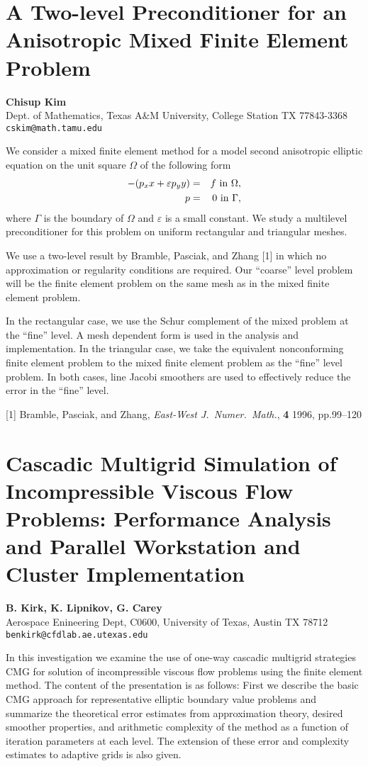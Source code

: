 \documentclass[11pt]{article}
\newcommand{\nextab}[4]{
	\section{#2}
	{\bf #1} \\ \nopagebreak
	{#3} \\ \nopagebreak
	{\tt #4} \nopagebreak
	}
\begin{document}

\nextab
{Chisup Kim}
{A Two-level Preconditioner for an Anisotropic Mixed Finite Element Problem}
{Dept. of Mathematics, Texas A\&M University, College Station TX 77843-3368}
{cskim@math.tamu.edu}


We consider a mixed finite element method for a model second anisotropic
elliptic equation on the unit square $\Omega$ of the following form
\begin{eqnarray}
- ( p_xx + \varepsilon p_yy ) &=& f  ~{\rm in} ~ \Omega,
\nonumber \\
p &=& 0  ~{\rm in} ~ \Gamma,
\nonumber
\end{eqnarray}
where $\Gamma$ is the boundary of $\Omega$ and $\varepsilon$
is a small constant.
We study a multilevel preconditioner for this problem on uniform
rectangular and triangular meshes.

We use a two-level result by Bramble, Pasciak, and Zhang [1]
in which no approximation or regularity
conditions are required.  Our ``coarse'' level problem will be the finite
element problem on the same mesh as in the mixed finite element problem.

In the rectangular case, we use the Schur complement of the mixed problem
at the ``fine'' level.  A mesh dependent form is used in the analysis and
implementation.  In the triangular case, we take the equivalent
nonconforming finite element problem to the mixed finite element problem
as the ``fine'' level problem.  In both cases, line Jacobi smoothers are
used to effectively reduce the error in the ``fine'' level.


[1] Bramble, Pasciak, and Zhang, {\em East-West J.~Numer.~Math.},
	{\bf 4} 1996, pp.99--120



\nextab
{B. Kirk, K. Lipnikov, G. Carey}
{Cascadic Multigrid Simulation of Incompressible Viscous Flow Problems:  Performance Analysis and Parallel Workstation and Cluster Implementation}
{Aerospace Enineering Dept, C0600, University of Texas, Austin TX 78712}
{benkirk@cfdlab.ae.utexas.edu}


In this investigation we examine the use of one-way cascadic
multigrid strategies CMG for solution of incompressible viscous
flow problems using the finite element method.  The content of
the presentation is as follows:  First we describe the basic CMG
approach for representative elliptic boundary value problems and
summarize the theoretical error estimates from approximation
theory, desired smoother properties, and arithmetic complexity
of the method as a function of iteration parameters at each
level.  The extension of these error and complexity estimates to
adaptive grids is also given.
\end{document}
